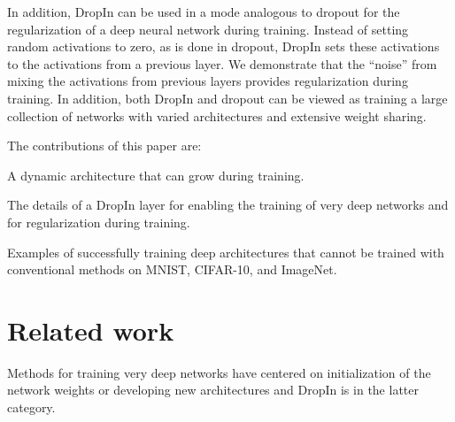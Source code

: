 \documentclass[10pt,twocolumn,letterpaper]{article}
\newcommand{\dropin}{DropIn }
\begin{document}
In addition, \dropin can be used in a mode analogous to dropout \cite{srivastava2014dropout} for the regularization of a deep neural network during training.  
Instead of setting random activations to zero, as is done in dropout, \dropin sets these activations to the activations from a previous layer.
We demonstrate that the ``noise'' from mixing the activations from previous layers provides regularization during training. 
In addition, both \dropin and dropout can be viewed as training a large collection of networks with varied architectures and extensive weight sharing.

The contributions of this paper are:
\begin{enumerate*}
  \vspace{-10pt}
\item A dynamic architecture that can grow during training.  
\item The details of a \dropin layer for enabling the training of very deep networks and for regularization during training.  
\item Examples of successfully training deep architectures that cannot be trained with conventional methods on MNIST, CIFAR-10, and ImageNet.
\end{enumerate*}



\section{Related work}
Methods for training very deep networks  have centered on initialization of the network weights or developing new architectures and \dropin is in the latter category.  
\end{document}
